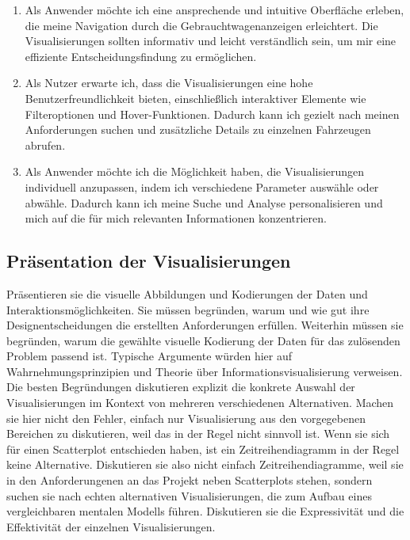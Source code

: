 \documentclass[usegeometry=true]{scrartcl}
\begin{document}
\begin{enumerate}
    \item Als Anwender möchte ich eine ansprechende und intuitive Oberfläche erleben, die meine Navigation durch die Gebrauchtwagenanzeigen erleichtert. Die Visualisierungen sollten informativ und leicht verständlich sein, um mir eine effiziente Entscheidungsfindung zu ermöglichen.
    
    \item Als Nutzer erwarte ich, dass die Visualisierungen eine hohe Benutzerfreundlichkeit bieten, einschließlich interaktiver Elemente wie Filteroptionen und Hover-Funktionen. Dadurch kann ich gezielt nach meinen Anforderungen suchen und zusätzliche Details zu einzelnen Fahrzeugen abrufen.
    
    \item Als Anwender möchte ich die Möglichkeit haben, die Visualisierungen individuell anzupassen, indem ich verschiedene Parameter auswähle oder abwähle. Dadurch kann ich meine Suche und Analyse personalisieren und mich auf die für mich relevanten Informationen konzentrieren.
    
\end{enumerate}



\subsection{Präsentation der Visualisierungen}
Präsentieren sie die visuelle Abbildungen und Kodierungen der Daten und Interaktionsmöglichkeiten. 
Sie müssen  begründen, warum und wie gut ihre Designentscheidungen die erstellten Anforderungen erfüllen. 
Weiterhin müssen sie begründen, warum die gewählte visuelle Kodierung der Daten für das zulösenden Problem passend ist.
Typische Argumente würden hier auf Wahrnehmungsprinzipien und Theorie über Informationsvisualisierung verweisen. 
Die besten Begründungen diskutieren explizit die konkrete Auswahl der Visualisierungen im Kontext von mehreren verschiedenen Alternativen. 
Machen sie hier nicht den Fehler, einfach nur Visualisierung aus den vorgegebenen Bereichen zu diskutieren, weil das in der Regel nicht sinnvoll ist.
Wenn sie sich für einen Scatterplot entschieden haben, ist ein Zeitreihendiagramm in der Regel keine Alternative.
Diskutieren sie also nicht einfach Zeitreihendiagramme, weil sie in den Anforderungenen an das Projekt neben Scatterplots stehen, sondern suchen sie nach echten alternativen Visualisierungen, die zum Aufbau eines vergleichbaren mentalen Modells führen. 
Diskutieren sie die Expressivität und die Effektivität der einzelnen Visualisierungen. 
\end{document}
